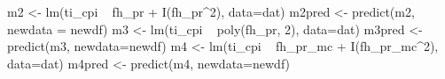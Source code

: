 \begin{Schunk}
\begin{Sinput}
 m2 <- lm(ti_cpi ~ fh_pr + I(fh_pr^2), data=dat)
 m2pred <- predict(m2, newdata = newdf)
 m3 <- lm(ti_cpi ~ poly(fh_pr, 2), data=dat)
 m3pred <- predict(m3, newdata=newdf)
 m4 <- lm(ti_cpi ~ fh_pr_mc + I(fh_pr_mc^2), data=dat)
 m4pred <- predict(m4, newdata=newdf)                                         
\end{Sinput}
\end{Schunk}
